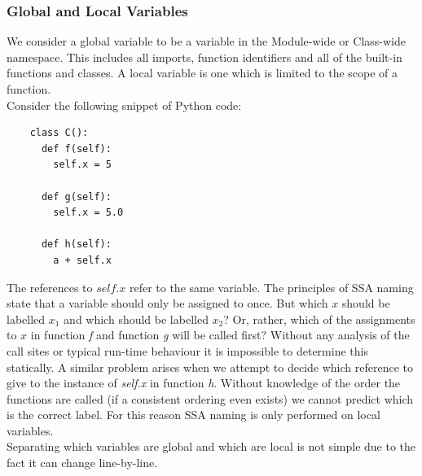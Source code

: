 \documentclass[12pt, titlepage]{article}
\begin{document}
\subsubsection{Global and Local Variables}

We consider a global variable to be a variable in the Module-wide or Class-wide namespace. This includes all imports, function identifiers and all of the built-in functions and classes. A local variable is one which is limited to the scope of a function. \\
Consider the following snippet of Python code:
\begin{lstlisting}
    class C():
      def f(self):
        self.x = 5
     
      def g(self):
        self.x = 5.0         
        
      def h(self):
        a + self.x 
\end{lstlisting}
The references to $self.x$ refer to the same variable. The principles of SSA naming state that a variable should only be assigned to once. But which $x$ should be labelled $x_1$ and which should be labelled $x_2$? Or, rather, which of the assignments to $x$ in function \textit{f} and function \textit{g} will be called first? Without any analysis of the call sites or typical run-time behaviour it is impossible to determine this statically. A similar problem arises when we attempt to decide which reference to give to the instance of \textit{self.x} in function \textit{h}. Without knowledge of the order the functions are called (if a consistent ordering even exists) we cannot predict which is the correct label. For this reason SSA naming is only performed on local variables. \\
Separating which variables are global and which are local is not simple due to the fact it can change line-by-line.
\end{document}
